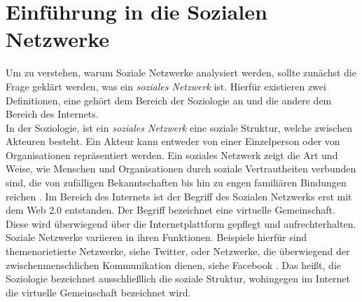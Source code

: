 \chapter{Einführung in die Sozialen Netzwerke}\label{ch:SNA}
Um zu verstehen, warum Soziale Netzwerke analysiert werden, sollte zunächst die Frage geklärt werden, was ein \textit{soziales Netzwerk} ist. Hierfür existieren zwei Definitionen, eine gehört dem Bereich der Soziologie an und die andere dem Bereich des Internets. \\
In der Soziologie, ist ein \textit{soziales Netzwerk} eine soziale Struktur, welche zwischen Akteuren besteht. Ein Akteur kann entweder von einer Einzelperson oder  von Organisationen repräsentiert werden. Ein soziales Netzwerk zeigt die Art und Weise, wie Menschen und Organisationen durch soziale Vertrautheiten verbunden sind, die von zufälligen Bekanntschaften bis hin zu engen familiären Bindungen reichen \cite{SNADefinition}. Im Bereich des Internets ist der Begriff des Sozialen Netzwerks erst mit dem Web 2.0 entstanden. Der Begriff bezeichnet eine virtuelle Gemeinschaft. Diese wird überwiegend über die Internetplattform gepflegt und aufrechterhalten. Soziale Netzwerke variieren in ihren Funktionen. Beispiele hierfür sind themenorietierte Netzwerke, siehe Twitter, oder Netzwerke, die überwiegend der zwischenmenschlichen Kommunikation dienen, siehe Facebook \cite{SNAWeb2.0}. Das heißt, die Soziologie bezeichnet ausschließlich die soziale Struktur, wohingegen im Internet die virtuelle Gemeinschaft bezeichnet wird.

